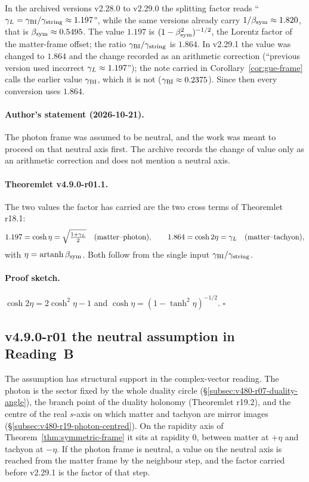 In the archived versions v2.28.0 to v2.29.0 the splitting factor reads
``\(\gamma_L=\gamma_{\mathrm{BI}}/\gamma_{\mathrm{string}}\approx1.197\)'', while the same versions already carry \(1/\beta_{\mathrm{sym}}\approx1.820\), that is
\(\beta_{\mathrm{sym}}\approx0.5495\).  The value \(1.197\) is \((1-\beta_{\mathrm{sym}}^2)^{-1/2}\), the Lorentz factor of the matter-frame
offset; the ratio \(\gamma_{\mathrm{BI}}/\gamma_{\mathrm{string}}\) is \(1.864\).  In v2.29.1 the value was changed to \(1.864\) and the change recorded
as an arithmetic correction (``previous version used incorrect \(\gamma_L\approx1.197\)''); the note carried in
Corollary~\ref{cor:gue-frame} calls the earlier value \(\gamma_{\mathrm{BI}}\), which it is not (\(\gamma_{\mathrm{BI}}\approx0.2375\)).  Since then
every conversion uses \(1.864\).

\paragraph{Author's statement (2026-10-21).}
The photon frame was assumed to be neutral, and the work was meant to proceed on that neutral axis first.  The archive
records the change of value only as an arithmetic correction and does not mention a neutral axis.

\paragraph{Theoremlet v4.9.0-r01.1.}
The two values the factor has carried are the two cross terms of Theoremlet r18.1:
\[
1.197=\cosh\eta=\sqrt{\tfrac{1+\gamma_L}{2}}\quad\text{(matter--photon)},\qquad
1.864=\cosh2\eta=\gamma_L\quad\text{(matter--tachyon)},
\]
with \(\eta=\operatorname{artanh}\beta_{\mathrm{sym}}\).  Both follow from the single input \(\gamma_{\mathrm{BI}}/\gamma_{\mathrm{string}}\).

\paragraph{Proof sketch.}
\(\cosh2\eta=2\cosh^2\eta-1\) and \(\cosh\eta=(1-\tanh^2\eta)^{-1/2}\).  \(\square\)

\subsection*{v4.9.0-r01 the neutral assumption in Reading~B}
\label{subsec:v490-r01-neutral}

The assumption has structural support in the complex-vector reading.  The photon is the sector fixed by the whole duality
circle (\S\ref{subsec:v480-r07-duality-angle}), the branch point of the duality holonomy (Theoremlet r19.2), and the
centre of the real \(s\)-axis on which matter and tachyon are mirror images (\S\ref{subsec:v480-r19-photon-centred}).
On the rapidity axis of Theorem~\ref{thm:symmetric-frame} it sits at rapidity \(0\), between matter at \(+\eta\) and
tachyon at \(-\eta\).  If the photon frame is neutral, a value on the neutral axis is reached from the matter frame by the
neighbour step, and the factor carried before v2.29.1 is the factor of that step.

